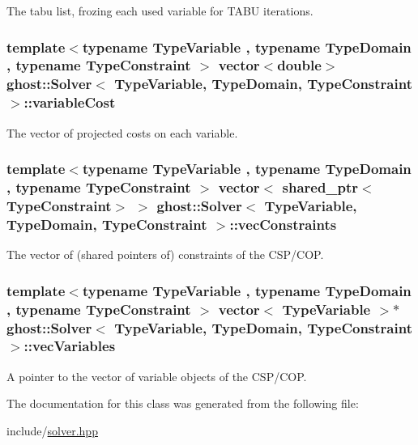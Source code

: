 The tabu list, frozing each used variable for T\-A\-B\-U iterations. 

\hypertarget{classghost_1_1Solver_a76c1057367112ead0304b436b5f508f1}{
\subsubsection[{variable\-Cost}]{\setlength{\rightskip}{0pt plus 5cm}template$<$typename Type\-Variable , typename Type\-Domain , typename Type\-Constraint $>$ vector$<$double$>$ {\bf ghost\-::\-Solver}$<$ Type\-Variable, Type\-Domain, Type\-Constraint $>$\-::variable\-Cost\hspace{0.3cm}{\ttfamily [private]}}}\label{classghost_1_1Solver_a76c1057367112ead0304b436b5f508f1}


The vector of projected costs on each variable. 

\hypertarget{classghost_1_1Solver_a170746edcfb777b12978444c2ab3962e}{
\subsubsection[{vec\-Constraints}]{\setlength{\rightskip}{0pt plus 5cm}template$<$typename Type\-Variable , typename Type\-Domain , typename Type\-Constraint $>$ vector$<$ shared\-\_\-ptr$<$Type\-Constraint$>$ $>$ {\bf ghost\-::\-Solver}$<$ Type\-Variable, Type\-Domain, Type\-Constraint $>$\-::vec\-Constraints\hspace{0.3cm}{\ttfamily [private]}}}\label{classghost_1_1Solver_a170746edcfb777b12978444c2ab3962e}


The vector of (shared pointers of) constraints of the C\-S\-P/\-C\-O\-P. 

\hypertarget{classghost_1_1Solver_a2d033a454234b2277aabdcc4d89eaba2}{
\subsubsection[{vec\-Variables}]{\setlength{\rightskip}{0pt plus 5cm}template$<$typename Type\-Variable , typename Type\-Domain , typename Type\-Constraint $>$ vector$<$ Type\-Variable $>$$\ast$ {\bf ghost\-::\-Solver}$<$ Type\-Variable, Type\-Domain, Type\-Constraint $>$\-::vec\-Variables\hspace{0.3cm}{\ttfamily [private]}}}\label{classghost_1_1Solver_a2d033a454234b2277aabdcc4d89eaba2}


A pointer to the vector of variable objects of the C\-S\-P/\-C\-O\-P. 



The documentation for this class was generated from the following file\-:\begin{DoxyCompactItemize}
\item 
include/\hyperlink{solver_8hpp}{solver.\-hpp}\end{DoxyCompactItemize}
